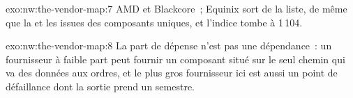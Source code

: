 \begin{solution}{exo:nw:the-vendor-map:7}
AMD et Blackcore~; Equinix sort de la liste, de même que la  et les  issues des composants uniques, et l'indice tombe à 1\,104.
\end{solution}

\begin{solution}{exo:nw:the-vendor-map:8}
La part de dépense n'est pas une dépendance~: un fournisseur à faible part peut fournir un composant situé sur le seul chemin qui va des données aux ordres, et le
plus gros fournisseur ici est aussi un point de défaillance dont la sortie prend un semestre.
\end{solution}

